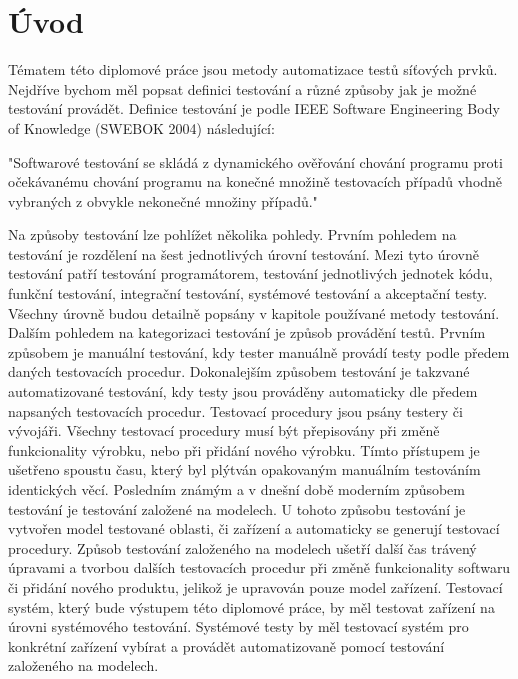 \chapter{Úvod}
Tématem této diplomové práce jsou metody automatizace testů síťových prvků. Nejdříve bychom měl popsat definici testování a různé způsoby jak je možné testování provádět. Definice testování je podle IEEE Software Engineering Body of Knowledge (SWEBOK 2004) následující:

"Softwarové testování se skládá z dynamického ověřování chování programu proti očekávanému chování programu na konečné množině testovacích případů vhodně vybraných z obvykle nekonečné množiny případů."

Na způsoby testování lze pohlížet několika pohledy. Prvním pohledem na testování je rozdělení na šest jednotlivých úrovní testování. Mezi tyto úrovně testování patří testování programátorem, testování jednotlivých jednotek kódu, funkční testování, integrační testování, systémové testování a akceptační testy. Všechny úrovně budou detailně popsány v kapitole používané metody testování. Dalším pohledem na kategorizaci testování je způsob provádění testů. Prvním způsobem je manuální testování, kdy tester manuálně provádí testy podle předem daných testovacích procedur. Dokonalejším způsobem testování je takzvané automatizované testování, kdy testy jsou prováděny automaticky dle předem napsaných testovacích procedur. Testovací procedury jsou psány testery či vývojáři. Všechny testovací procedury musí být přepisovány při změně funkcionality výrobku, nebo při přidání nového výrobku. Tímto přístupem je ušetřeno spoustu času, který byl plýtván opakovaným manuálním testováním identických věcí. Posledním známým a v dnešní době moderním způsobem testování je testování založené na modelech. U tohoto způsobu testování je vytvořen model testované oblasti, či zařízení a automaticky se generují testovací procedury. Způsob testování založeného na modelech ušetří další čas trávený úpravami a tvorbou dalších testovacích procedur při změně funkcionality softwaru či přidání nového produktu, jelikož je upravován pouze model zařízení. Testovací systém, který bude výstupem této diplomové práce, by měl testovat zařízení na úrovni systémového testování. Systémové testy by měl testovací systém pro konkrétní zařízení vybírat a  provádět automatizovaně pomocí testování založeného na modelech.

